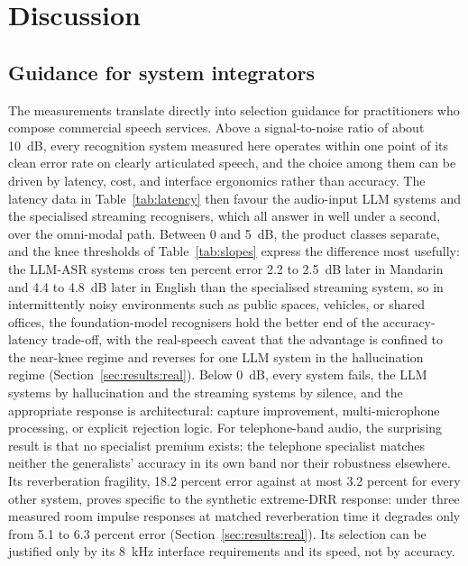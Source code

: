 \section{Discussion}
\label{sec:discussion}

\subsection{Guidance for system integrators}

The measurements translate directly into selection guidance for practitioners
who compose commercial speech services. Above a signal-to-noise ratio of
about 10~dB, every recognition system measured here operates within one
point of its clean error rate on clearly articulated speech, and the choice
among them can be driven by latency, cost, and interface ergonomics rather
than accuracy. The latency data in Table~\ref{tab:latency} then favour the
audio-input LLM systems and the specialised streaming recognisers, which
all answer in well under a second, over the omni-modal path. Between 0 and
5~dB, the product classes separate, and the knee thresholds of
Table~\ref{tab:slopes} express the difference most usefully: the LLM-ASR
systems cross ten percent error 2.2 to 2.5~dB later in Mandarin and 4.4 to
4.8~dB later in English than the specialised streaming system, so in
intermittently noisy environments such as public spaces, vehicles, or
shared offices, the foundation-model recognisers hold the better end of
the accuracy-latency trade-off, with the real-speech caveat that the
advantage is confined to the near-knee regime and reverses for one LLM
system in the hallucination regime (Section~\ref{sec:results:real}). Below 0~dB, every system fails, the LLM
systems by hallucination and the streaming systems by silence, and the
appropriate response is architectural: capture improvement, multi-microphone
processing, or explicit rejection logic. For telephone-band audio, the
surprising result is that no specialist premium exists: the telephone
specialist matches neither the generalists' accuracy in its own band nor
their robustness elsewhere. Its reverberation fragility, 18.2 percent
error against at most 3.2 percent for every other system, proves specific
to the synthetic extreme-DRR response: under three measured room impulse
responses at matched reverberation time it degrades only from 5.1 to 6.3
percent error (Section~\ref{sec:results:real}). Its selection can be
justified only by its 8~kHz interface requirements
and its speed, not by accuracy.

